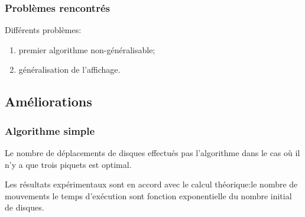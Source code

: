 \documentclass{beamer}%
\begin{document}
			\begin{frame}
				\frametitle{Problèmes rencontrés}
				Différents problèmes:
				\begin{enumerate}
					\item premier algorithme non-généralisable;
					\item généralisation de l'affichage.
				\end{enumerate}
			\end{frame}
			
		\subsection{Améliorations}
			\begin{frame}
				\frametitle{Algorithme simple}
				Le nombre de déplacements de disques effectués pas l'algorithme
				dans le cas où il n'y a que trois piquets est optimal.
				
				\begin{figure}
					\centering
					\qquad
				\end{figure}
				
				Les résultats expérimentaux sont en accord avec
				le calcul théorique:le nombre de mouvements
				le temps d'exécution sont fonction exponentielle du nombre
				initial de disques.
			\end{frame}
			
\end{document}
